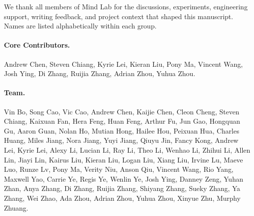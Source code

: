 \documentclass{mindlab}
\begin{document}















We thank all members of Mind Lab for the discussions, experiments, engineering support, writing feedback, and project context that shaped this manuscript. Names are listed alphabetically within each group.

\paragraph{Core Contributors.}
\begin{sloppypar}
Andrew Chen, Steven Chiang, Kyrie Lei, Kieran Liu, Pony Ma, Vincent Wang, Josh Ying, Di Zhang, Ruijia Zhang, Adrian Zhou, Yuhua Zhou.
\end{sloppypar}

\paragraph{Team.}
\begin{sloppypar}
Vin Bo, Song Cao, Vic Cao, Andrew Chen, Kaijie Chen, Cleon Cheng, Steven Chiang, Kaixuan Fan, Hera Feng, Huan Feng, Arthur Fu, Jun Gao, Hongquan Gu, Aaron Guan, Nolan Ho, Mutian Hong, Hailee Hou, Peixuan Hua, Charles Huang, Miles Jiang, Nora Jiang, Yuyi Jiang, Qiuyu Jin, Fancy Kong, Andrew Lei, Kyrie Lei, Alexy Li, Lucian Li, Ray Li, Theo Li, Wenhao Li, Zhihui Li, Allen Lin, Jiayi Lin, Kairus Liu, Kieran Liu, Logan Liu, Xiang Liu, Irvine Lu, Maeve Luo, Runze Lv, Pony Ma, Verity Niu, Anson Qiu, Vincent Wang, Rio Yang, Maxwell Yao, Carrie Ye, Regis Ye, Wenlin Ye, Josh Ying, Danney Zeng, Yuhan Zhan, Anya Zhang, Di Zhang, Ruijia Zhang, Shiyang Zhang, Sueky Zhang, Ya Zhang, Wei Zhao, Ada Zhou, Adrian Zhou, Yuhua Zhou, Xinyue Zhu, Murphy Zhuang.
\end{sloppypar}



\end{document}
